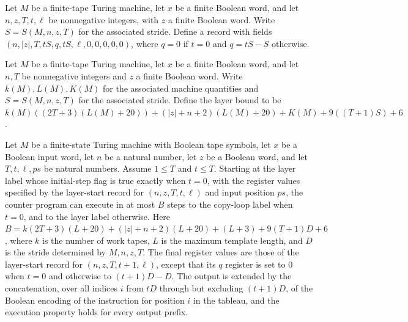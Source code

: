 \begin{definition}
\label{Complexity.UTab.lstart}
\leanok
{}
Let $M$ be a finite-tape Turing machine, let $x$ be a finite Boolean word, and let
$n,z,T,t,\ell$ be nonnegative integers, with $z$ a finite Boolean word. Write
$S=S(M,n,z,T)$ for the associated stride. Define a record with fields
$(n,|z|,T,tS,q,tS,\ell,0,0,0,0,0)$, where $q=0$ if $t=0$ and $q=tS-S$ otherwise.
\end{definition}

\begin{definition}
\label{Complexity.UTab.layerBound}
\leanok
{}
Let $M$ be a finite-tape Turing machine, let $x$ be a finite Boolean word, and let $n,T$
be nonnegative integers and $z$ a finite Boolean word. Write $k(M),L(M),K(M)$ for the
associated machine quantities and $S=S(M,n,z,T)$ for the associated stride. Define the
layer bound to be $k(M)((2T+3)(L(M)+20))+(|z|+n+2)(L(M)+20)+K(M)+9((T+1)S)+6$.
\end{definition}

\begin{theorem}
\label{Complexity.UTab.goes_layer}
\leanok
{}
Let $M$ be a finite-state Turing machine with Boolean tape symbols, let $x$ be a Boolean
input word, let $n$ be a natural number, let $z$ be a Boolean word, and let
$T,t,\ell,ps$ be natural numbers. Assume $1\le T$ and $t\le T$. Starting at the layer
label whose initial-step flag is true exactly when $t=0$, with the register values
specified by the layer-start record for $(n,z,T,t,\ell)$ and input position $ps$, the
counter program can execute in at most $B$ steps to the copy-loop label when $t=0$, and
to the layer label otherwise. Here $B=k(2T+3)(L+20)+( |z|+n+2)(L+20)+(L+3)+9(T+1)D+6$,
where $k$ is the number of work tapes, $L$ is the maximum template length, and $D$ is
the stride determined by $M,n,z,T$. The final register values are those of the
layer-start record for $(n,z,T,t+1,\ell)$, except that its $q$ register is set to $0$
when $t=0$ and otherwise to $(t+1)D-D$. The output is extended by the concatenation,
over all indices $i$ from $tD$ through but excluding $(t+1)D$, of the Boolean encoding
of the instruction for position $i$ in the tableau, and the execution property holds for
every output prefix.
\end{theorem}

